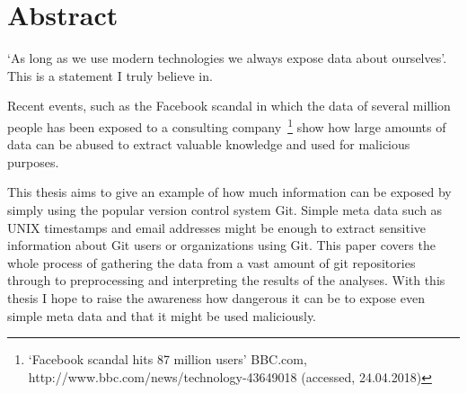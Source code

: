 \chapter*{Abstract}


`As long as we use modern technologies we always expose data about ourselves'. This is a statement I truly believe in.

Recent events, such as the Facebook scandal in which the data of several million people has been exposed to a consulting company~\footnote{`Facebook scandal hits 87 million users' BBC.com, http://www.bbc.com/news/technology-43649018 (accessed, 24.04.2018)} show how large amounts of data can be abused to extract valuable knowledge and used for malicious purposes.

This thesis aims to give an example of how much information can be exposed by simply using the popular version control system Git.
Simple meta data such as UNIX timestamps and email addresses might be enough to extract sensitive information about Git users or organizations using Git.
This paper covers the whole process of gathering the data from a vast amount of git repositories through to preprocessing and interpreting the results of the analyses.
With this thesis I hope to raise the awareness how dangerous it can be to expose even simple meta data and that it might be used maliciously.
